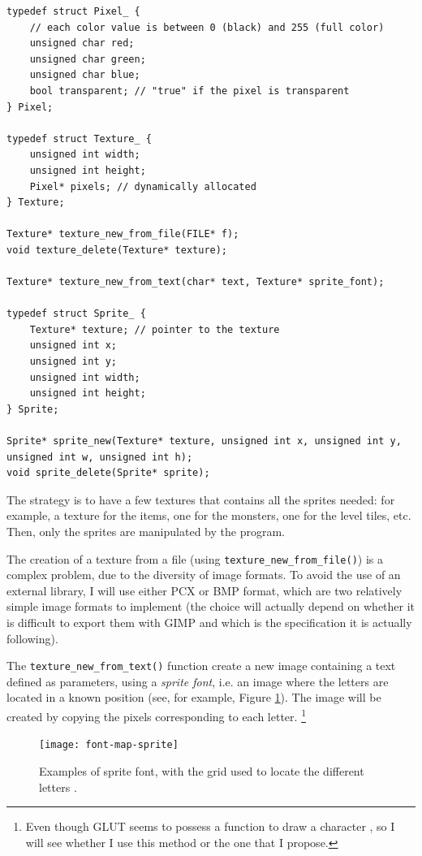 \documentclass[12pt,a4paper]{article}
\begin{document}
\begin{verbatim}
typedef struct Pixel_ {
	// each color value is between 0 (black) and 255 (full color)
	unsigned char red;
	unsigned char green;
	unsigned char blue;
	bool transparent; // "true" if the pixel is transparent 
} Pixel;

typedef struct Texture_ {
	unsigned int width;
	unsigned int height;
	Pixel* pixels; // dynamically allocated
} Texture;

Texture* texture_new_from_file(FILE* f);
void texture_delete(Texture* texture);

Texture* texture_new_from_text(char* text, Texture* sprite_font);

typedef struct Sprite_ {
	Texture* texture; // pointer to the texture
	unsigned int x;
	unsigned int y;
	unsigned int width;
	unsigned int height;
} Sprite;

Sprite* sprite_new(Texture* texture, unsigned int x, unsigned int y, unsigned int w, unsigned int h);
void sprite_delete(Sprite* sprite);
\end{verbatim}

The strategy is to have a few textures that contains all the sprites needed: for example, a texture for the items, one for the monsters, one for the level tiles, etc. Then, only the sprites are manipulated by the program.

The creation of a texture from a file (using \texttt{texture_new_from_file()}) is a complex problem, due to the diversity of image formats. To avoid the use of an external library, I will use either PCX \cite{pcx_spec} or BMP \cite{bmp_spec} format, which are two relatively simple image formats to implement (the choice will actually depend on whether it is difficult to export them with GIMP and which is the specification it is actually following).

The \texttt{texture_new_from_text()} function create a new image containing a text defined as parameters, using a \textit{sprite font}, i.e. an image where the letters are located in a known position (see, for example, Figure \ref{fig:def:spritefont}). The image will be created by copying the pixels corresponding to each letter. \footnote{Even though GLUT seems to possess a function to draw a character \cite{glutrefchar}, so I will see whether I use this method or the one that I propose.}

\begin{figure}[!h]
\centering
\texttt{[image: font-map-sprite]}
\caption{Examples of sprite font, with the grid used to locate the different letters \cite{dafont}.}
\label{fig:def:spritefont}
\end{figure}
\end{document}
